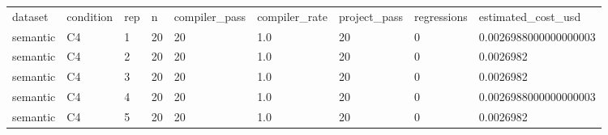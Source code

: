 \begin{tabular}{lllllllll}
dataset & condition & rep & n & compiler\_pass & compiler\_rate & project\_pass & regressions & estimated\_cost\_usd \\
semantic & C4 & 1 & 20 & 20 & 1.0 & 20 & 0 & 0.0026988000000000003 \\
semantic & C4 & 2 & 20 & 20 & 1.0 & 20 & 0 & 0.0026982 \\
semantic & C4 & 3 & 20 & 20 & 1.0 & 20 & 0 & 0.0026982 \\
semantic & C4 & 4 & 20 & 20 & 1.0 & 20 & 0 & 0.0026988000000000003 \\
semantic & C4 & 5 & 20 & 20 & 1.0 & 20 & 0 & 0.0026982 \\
\end{tabular}